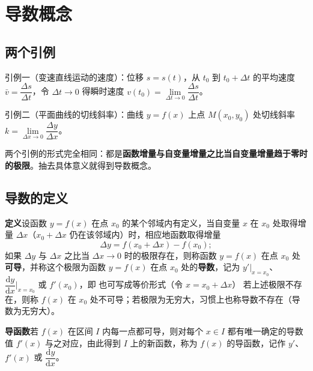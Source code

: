 
\section{导数概念}

\subsection{两个引例}
引例一（变速直线运动的速度）：位移 $s=s(t)$，从 $t_0$ 到 $t_0+\Delta t$ 的平均速度 $\bar v=\dfrac{\Delta s}{\Delta t}$，令 $\Delta t\to0$ 得瞬时速度 $v(t_0)=\lim\limits_{\Delta t\to0}\dfrac{\Delta s}{\Delta t}$。

引例二（平面曲线的切线斜率）：曲线 $y=f(x)$ 上点 $M(x_0,y_0)$ 处切线斜率 $k=\lim\limits_{\Delta x\to0}\dfrac{\Delta y}{\Delta x}$。

两个引例的形式完全相同：都是\textbf{函数增量与自变量增量之比当自变量增量趋于零时的极限}。抽去具体意义就得到导数概念。

\subsection{导数的定义}
\textbf{定义}\quad 设函数 $y=f(x)$ 在点 $x_0$ 的某个邻域内有定义，当自变量 $x$ 在 $x_0$ 处取得增量 $\Delta x$（$x_0+\Delta x$ 仍在该邻域内）时，相应地函数取得增量
\[
\Delta y=f(x_0+\Delta x)-f(x_0);
\]
如果 $\Delta y$ 与 $\Delta x$ 之比当 $\Delta x\to0$ 时的极限存在，则称函数 $y=f(x)$ 在点 $x_0$ 处\textbf{可导}，并称这个极限为函数 $y=f(x)$ 在点 $x_0$ 处的\textbf{导数}，记为 $y'|_{x=x_0}$、$\dfrac{\mathrm{d}y}{\mathrm{d}x}\Big|_{x=x_0}$ 或 $f'(x_0)$，即
\noindent 也可写成等价形式（令 $x=x_0+\Delta x$）
\noindent 若上述极限不存在，则称 $f(x)$ 在 $x_0$ 处不可导；若极限为无穷大，习惯上也称导数不存在（导数为无穷大）。

\textbf{导函数}\quad 若 $f(x)$ 在区间 $I$ 内每一点都可导，则对每个 $x\in I$ 都有唯一确定的导数值 $f'(x)$ 与之对应，由此得到 $I$ 上的新函数，称为 $f(x)$ 的导函数，记作 $y'$、$f'(x)$ 或 $\dfrac{\mathrm{d}y}{\mathrm{d}x}$。

